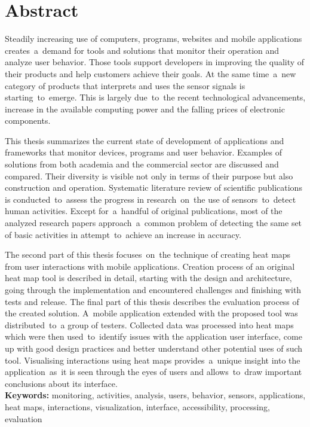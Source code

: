 \chapter*{Abstract}
Steadily increasing use of computers, programs, websites and mobile applications creates~a~demand for tools and solutions that monitor their operation and analyze user behavior. Those tools support developers in improving the quality of their products and help customers achieve their goals. At the same time~a~new category of products that interprets and uses the sensor signals is starting~to~emerge. This is largely due~to~the recent technological advancements, increase in the available computing power and the falling prices of electronic components.

This thesis summarizes the current state of development of applications and frameworks that monitor devices, programs and user behavior. Examples of solutions from both academia and the commercial sector are discussed and compared. Their diversity is visible not only in terms of their purpose but also construction and operation. Systematic literature review of scientific publications is conducted~to~assess the progress in research~on~the use of sensors~to~detect human activities. Except for~a~handful of original publications, most of the analyzed research papers approach~a~common problem of detecting the same set of basic activities in attempt~to~achieve an increase in accuracy.

The second part of this thesis focuses~on~the technique of creating heat maps from user interactions with mobile applications. Creation process of an original heat map tool is described in detail, starting with the design and architecture, going through the implementation and encountered challenges and finishing with tests and release. The final part of this thesis describes the evaluation process of the created solution. A~mobile application extended with the proposed tool was distributed~to~a group of testers. Collected data was processed into heat maps which were then used~to~identify issues with the application user interface, come up with good design practices and better understand other potential uses of such tool. Visualising interactions using heat maps provides~a~unique insight into the application~as~it is seen through the eyes of users and allows~to~draw important conclusions about its interface. \\

\noindent\textbf{Keywords:} monitoring, activities, analysis, users, behavior, sensors, applications, heat maps, interactions, visualization, interface, accessibility, processing, evaluation
